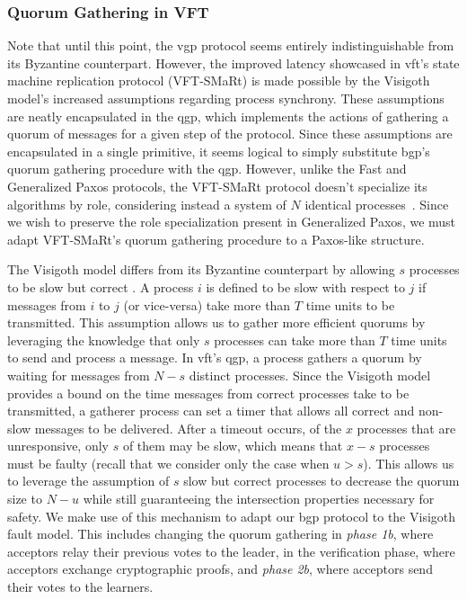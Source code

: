 \subsubsection{Quorum Gathering in VFT}
Note that until this point, the \acrshort{vgp} protocol seems entirely indistinguishable from its Byzantine counterpart. However, the improved latency showcased in \acrshort{vft}'s state machine replication protocol (VFT-SMaRt) is made possible by the Visigoth model's increased assumptions regarding process synchrony. These assumptions are neatly encapsulated in the \acrfull{qgp}, which implements the actions of gathering a quorum of messages for a given step of the protocol. Since these assumptions are encapsulated in a single primitive, it seems logical to simply substitute \acrshort{bgp}'s quorum gathering procedure with the \acrshort{qgp}. However, unlike the Fast and Generalized Paxos protocols, the VFT-SMaRt protocol doesn't specialize its algorithms by role, considering instead a system of $N$ identical processes~\cite{Porto2015}. Since we wish to preserve the role specialization present in Generalized Paxos, we must adapt VFT-SMaRt's quorum gathering procedure to a Paxos-like structure.\par
The Visigoth model differs from its Byzantine counterpart by allowing $s$ processes to be slow but correct \cite{Porto2015}. A process $i$ is defined to be slow with respect to $j$ if messages from $i$ to $j$ (or vice-versa) take more than $T$ time units to be transmitted. This assumption allows us to gather more efficient quorums by leveraging the knowledge that only $s$ processes can take more than $T$ time units to send and process a message. In \acrshort{vft}'s \acrlong{qgp}, a process gathers a quorum by waiting for messages from $N-s$ distinct processes. Since the Visigoth model provides a bound on the time messages from correct processes take to be transmitted, a gatherer process can set a timer that allows all correct and non-slow  messages to be delivered. After a timeout occurs, of the $x$ processes that are unresponsive, only $s$ of them may be slow, which means that $x-s$ processes must be faulty (recall that we consider only the case when $u>s$). This allows us to leverage the assumption of $s$ slow but correct processes to decrease the quorum size to $N-u$ while still guaranteeing the intersection properties necessary for safety. We make use of this mechanism to adapt our \acrlong{bgp} protocol to the Visigoth fault model. This includes changing the quorum gathering in \textit{phase 1b}, where acceptors relay their previous votes to the leader, in the verification phase, where acceptors exchange cryptographic proofs, and \textit{phase 2b}, where acceptors send their votes to the learners. \par
